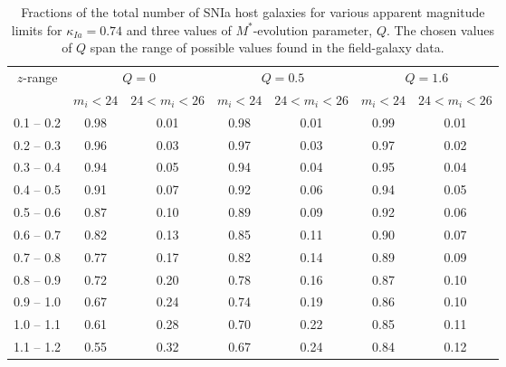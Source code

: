 \documentclass[preprint2]{aastex}    %
\begin{document}
\begin{table}[h]
\centering%
\begin{tabular}
[c]{|c||c|c||c|c||c|c|}\hline
$z$-range & \multicolumn{2}{c||}{$Q=0$} & \multicolumn{2}{c||}{$Q=0.5$}  & \multicolumn{2}{c|}{$Q=1.6$} \\ \cline{2-7}
          & $m_i<24$ & $24<m_i<26$ & $m_i<24$ & $24<m_i<26$ & $m_i<24$ & $24<m_i<26$ \\
\hline
0.1 -- 0.2 & 0.98  & 0.01   & 0.98  & 0.01  & 0.99  & 0.01   \\
0.2 -- 0.3 & 0.96  & 0.03   & 0.97  & 0.03  & 0.97  & 0.02   \\
0.3 -- 0.4 & 0.94  & 0.05  & 0.94  & 0.04  & 0.95  & 0.04  \\
0.4 -- 0.5 & 0.91  & 0.07  & 0.92  & 0.06  & 0.94  & 0.05  \\
0.5 -- 0.6 & 0.87  & 0.10  & 0.89  & 0.09  & 0.92  & 0.06  \\
0.6 -- 0.7 & 0.82  & 0.13  & 0.85  & 0.11  & 0.90  & 0.07   \\
0.7 -- 0.8 & 0.77  & 0.17  & 0.82  & 0.14  & 0.89  & 0.09   \\
0.8 -- 0.9 & 0.72  & 0.20  & 0.78  & 0.16   & 0.87  & 0.10  \\
0.9 -- 1.0 & 0.67 & 0.24  & 0.74  & 0.19   & 0.86  & 0.10  \\
1.0 -- 1.1 & 0.61 & 0.28 & 0.70 & 0.22  & 0.85  & 0.11  \\
1.1 -- 1.2 & 0.55 & 0.32  & 0.67 & 0.24  & 0.84  & 0.12  \\

\hline
\end{tabular}
\caption{Fractions of the total number of SNIa host galaxies for various apparent magnitude limits for
$\kappa_{Ia}=0.74$ and three values of $M^*$-evolution parameter, $Q$. 
The chosen values of $Q$ span the range of possible values found in the field-galaxy data.}
\label{tab:galfraction-evol}%
\end{table} 
\end{document}
